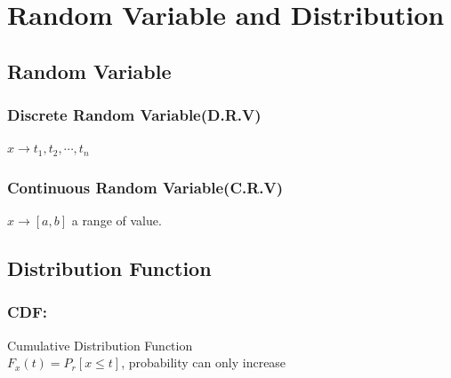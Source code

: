 \documentclass{article}
\begin{document}
\section{Random Variable and Distribution}{
    \subsection{Random Variable}{
        \subsubsection{Discrete Random Variable(D.R.V)}{
            $ x\rightarrow t_1, t_2, \cdots, t_n$
        }
        \subsubsection{Continuous Random Variable(C.R.V)}{
            $ x\rightarrow [a, b]$ a range of value.
        }
    }
    \subsection{Distribution Function}{
        \subsubsection{CDF: }{
            Cumulative Distribution Function\\
            $ F_x(t)= P_r[x\le t]$, probability can only increase\\

}}}
\end{document}
